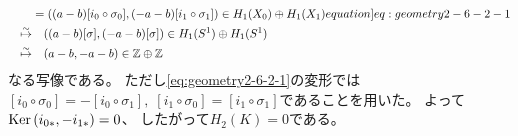 \documentclass[report]{jlreq}
\begin{document}
\begin{answer}
\begin{alignat}{1}
        \qquad
            &= (
                (a - b)[i_0 \circ \sigma_0],
                (- a - b)[i_1 \circ \sigma_1]
            ) \in H_1(X_0) \oplus H_1(X_1)
            \label[equation]{eq:geometry2-6-2-1} \\
        \overset{\sim}{\mapsto}
            &\quad
            ((a - b)[\sigma], (- a - b)[\sigma]) \in H_1(S^1) \oplus H_1(S^1) \\
        \overset{\sim}{\mapsto}
            &\quad
            (a - b, - a - b) \in \Z \oplus \Z
    \end{alignat}
    なる写像である。
    ただし\cref{eq:geometry2-6-2-1}の変形では
    $[i_0 \circ \sigma_0] = - [i_0 \circ \sigma_1], \;
        [i_1 \circ \sigma_0] = [i_1 \circ \sigma_1]$であることを用いた。
    よって$\operatorname{\mathrm{Ker}} \, (i_{0*}, -i_{1*}) = 0$、
    したがって$H_2(K) = 0$である。


\end{answer}
\end{document}

